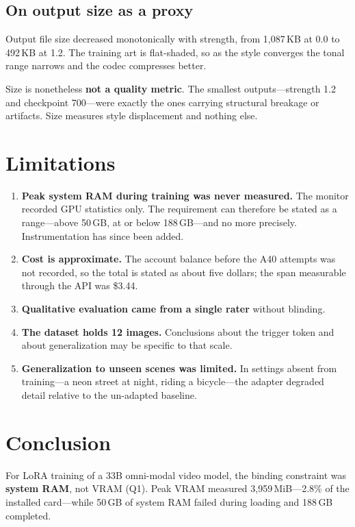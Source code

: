 \documentclass[10pt,twocolumn]{article}
\begin{document}
\subsection{On output size as a proxy}

Output file size decreased monotonically with strength, from 1{,}087\,KB at 0.0 to 492\,KB at 1.2. The training art is flat-shaded, so as the style converges the tonal range narrows and the codec compresses better.

Size is nonetheless \textbf{not a quality metric}. The smallest outputs---strength 1.2 and checkpoint 700---were exactly the ones carrying structural breakage or artifacts. Size measures style displacement and nothing else.

\section{Limitations}

\begin{enumerate}[leftmargin=1.6em,topsep=2pt,itemsep=2pt]
  \item \textbf{Peak system RAM during training was never measured.} The monitor recorded GPU statistics only. The requirement can therefore be stated as a range---above 50\,GB, at or below 188\,GB---and no more precisely. Instrumentation has since been added.
  \item \textbf{Cost is approximate.} The account balance before the A40 attempts was not recorded, so the total is stated as about five dollars; the span measurable through the API was \$3.44.
  \item \textbf{Qualitative evaluation came from a single rater} without blinding.
  \item \textbf{The dataset holds 12 images.} Conclusions about the trigger token and about generalization may be specific to that scale.
  \item \textbf{Generalization to unseen scenes was limited.} In settings absent from training---a neon street at night, riding a bicycle---the adapter degraded detail relative to the un-adapted baseline.
\end{enumerate}

\section{Conclusion}

For LoRA training of a 33B omni-modal video model, the binding constraint was \textbf{system RAM}, not VRAM (Q1). Peak VRAM measured 3{,}959\,MiB---2.8\% of the installed card---while 50\,GB of system RAM failed during loading and 188\,GB completed.
\end{document}
